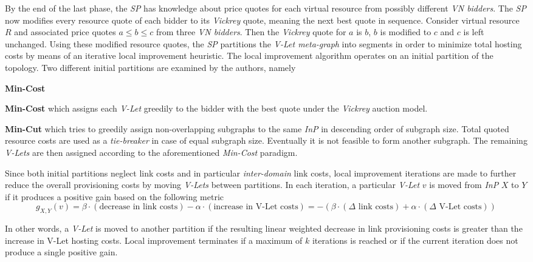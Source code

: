 \documentclass[prodmode,acmtomccap]{acmlarge}
\begin{document}
By the end of the last phase, the \emph{SP} has knowledge about price quotes for each virtual resource from possibly different \emph{VN bidders}. The \emph{SP} now modifies every
resource quote of each bidder to its \emph{Vickrey} quote, meaning the next best quote in sequence. Consider virtual resource $R$ and associated price quotes $a \leq b \leq c$ from three \emph{VN bidders}.
Then the \emph{Vickrey} quote for $a$ is $b$, $b$ is modified to $c$ and $c$ is left unchanged.
Using these modified resource quotes, the \emph{SP} partitions the \emph{V-Let meta-graph} into segments
in order to minimize total hosting costs by means of an iterative local improvement heuristic. The local improvement algorithm operates on an initial partition of the topology. Two different initial partitions are
examined by the authors, namely

\begin{describe}{{\bfseries Min-Cost\/}}
	\item[\bfseries Min-Cost] which assigns each \emph{V-Let} greedily to the bidder with the best quote under the \emph{Vickrey} auction model.
	\item[\bfseries Min-Cut] which tries to greedily assign non-overlapping subgraphs to the same \emph{InP} in descending order of subgraph size. Total quoted resource costs are used as a \emph{tie-breaker}
		in case of equal subgraph size. Eventually it is not feasible to form another subgraph. The remaining \emph{V-Lets} are then assigned according to the aforementioned \emph{Min-Cost} paradigm.
\end{describe}

Since both initial partitions neglect link costs and in particular \emph{inter-domain} link costs, local improvement iterations are made to further reduce the overall provisioning costs by moving
\emph{V-Lets} between partitions. In each iteration, a particular \emph{V-Let} $v$ is moved from \emph{InP} $X$ to $Y$ if it produces a positive gain based on the following metric
$$
	g_{X,Y}(v) = \beta \cdot (\text{decrease in link costs}) - \alpha \cdot (\text{increase in V-Let costs}) = -\left(\beta \cdot (\Delta \text{ link costs}) + \alpha \cdot (\Delta \text{ V-Let costs})\right) 
$$

In other words, a \emph{V-Let} is moved to another partition if the resulting linear weighted decrease in link provisioning costs is greater than the increase in V-Let hosting costs.
Local improvement terminates if a maximum of $k$ iterations is reached or if the current iteration does not produce a single positive gain.
\end{document}

